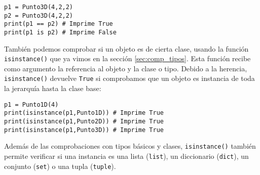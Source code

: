 \begin{lstlisting}
p1 = Punto3D(4,2,2)
p2 = Punto3D(4,2,2)
print(p1 == p2) # Imprime True
print(p1 is p2) # Imprime False
\end{lstlisting}

También podemos comprobar si un objeto es de cierta clase, usando la función \texttt{isinstance()} que ya vimos en la sección \ref{sec:comp_tipos}. Esta función recibe como argumento la referencia al objeto y la clase o tipo. Debido a la herencia, \texttt{isinstance()} devuelve \texttt{True} si comprobamos que un objeto es instancia de toda la jerarquía hasta la clase base:

\begin{lstlisting}
p1 = Punto1D(4)
print(isinstance(p1,Punto1D)) # Imprime True
print(isinstance(p1,Punto2D)) # Imprime True
print(isinstance(p1,Punto3D)) # Imprime True
\end{lstlisting}

Además de las comprobaciones con tipos básicos y clases, \texttt{isinstance()} también permite verificar si una instancia es una lista (\texttt{list}), un diccionario (\texttt{dict}), un conjunto (\texttt{set}) o una tupla (\texttt{tuple}).